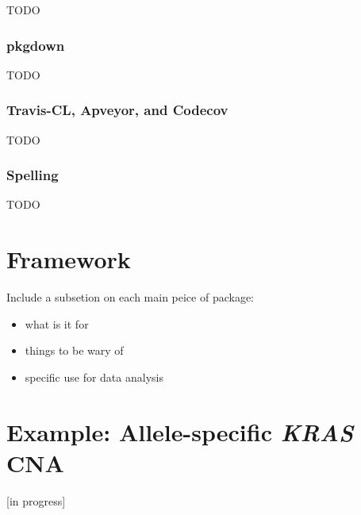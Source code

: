 \documentclass[]{book}
\providecommand{\tightlist}{%
  \setlength{\itemsep}{0pt}\setlength{\parskip}{0pt}}
\begin{document}
TODO

\subsection{pkgdown}\label{pkgdown}

TODO

\subsection{Travis-CL, Apveyor, and
Codecov}\label{travis-cl-apveyor-and-codecov}

TODO

\subsection{Spelling}\label{spelling}

TODO

\chapter{Framework}\label{framework}

Include a subsetion on each main peice of package:

\begin{itemize}
\tightlist
\item
  what is it for
\item
  things to be wary of
\item
  specific use for data analysis
\end{itemize}

\chapter{\texorpdfstring{Example: Allele-specific \emph{KRAS}
CNA}{Example: Allele-specific KRAS CNA}}\label{example-allele-specific-kras-cna}

{[}in progress{]}


\end{document}
